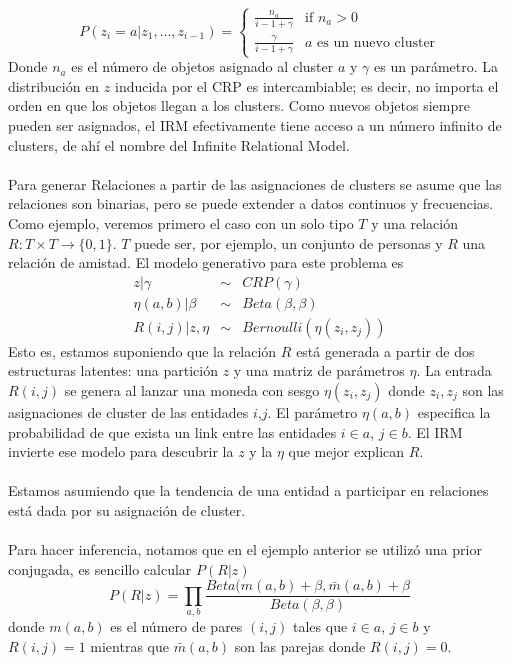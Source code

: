 \documentclass[11pt]{article}
\theoremstyle{plain}
\begin{document}
\[
  P(z_i = a | z_1, ... , z_{i-1}) =
  \begin{cases}
                                   \frac{n_a}{i-1+\gamma} & \text{if $n_a > 0$} \\
                                   \frac{\gamma}{i-1+\gamma} & \text{$a$ es un nuevo cluster} 
  \end{cases}
\]
Donde $n_a$ es el número de objetos asignado al cluster $a$ y $\gamma$ es un parámetro. La distribución en $z$ inducida por el CRP es intercambiable; es decir, no importa el orden en que los objetos llegan a los clusters. Como nuevos objetos siempre pueden ser asignados, el IRM efectivamente tiene acceso a un número infinito de clusters, de ahí el nombre del Infinite Relational Model.\\
\\
Para generar Relaciones a partir de las asignaciones de clusters se asume que las relaciones son binarias, pero se puede extender a datos continuos y frecuencias. Como ejemplo, veremos primero el caso con un solo tipo $T$ y una relación $R: T \times T \to \{0,1 \}$. $T$ puede ser, por ejemplo, un conjunto de personas y $R$ una relación de amistad. El modelo generativo para este problema es
\begin{eqnarray*}
z | \gamma &\sim& CRP(\gamma)\\
\eta(a,b) | \beta &\sim& Beta(\beta,\beta)\\
R(i,j) | z, \eta &\sim& Bernoulli(\eta(z_i,z_j))
\end{eqnarray*}
Esto es, estamos suponiendo que la relación $R$ está generada a partir de dos estructuras latentes: una partición $z$ y una matriz de parámetros $\eta$. La entrada $R(i,j)$ se genera al lanzar una moneda con sesgo $\eta(z_i,z_j)$ donde $z_i,z_j$ son las asignaciones de cluster de las entidades $i$,$j$. El parámetro $\eta(a,b)$ especifica la probabilidad de que exista un link entre las entidades $i \in a$, $j \in b$. El IRM invierte ese modelo para descubrir la $z$ y la $\eta$ que mejor explican $R$.\\
\\
Estamos asumiendo que la tendencia de una entidad a participar en relaciones está dada por su asignación de cluster.\\
\\
Para hacer inferencia, notamos que en el ejemplo anterior se utilizó una prior conjugada, es sencillo calcular $P(R|z)$
\[ P(R|z)= \prod_{a,b} \frac{Beta(m(a,b) + \beta, \bar{m}(a,b)+\beta}{Beta(\beta,\beta)} \]
donde $m(a,b)$ es el número de pares $(i,j)$ tales que $i \in a$, $j \in b$ y $R(i,j)=1$ mientras que $\bar{m}(a,b)$ son las parejas donde $R(i,j)=0.$\\
\end{document}
